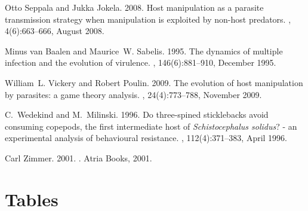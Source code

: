 \documentclass[11pt]{article}
\begin{document}
\begin{thebibliography}{24}
Otto Seppala and Jukka Jokela. 2008.
\newblock Host manipulation as a parasite transmission strategy when
  manipulation is exploited by non-host predators.
, 4(6):663--666, August 2008.

Minus van Baalen and Maurice~W. Sabelis. 1995.
\newblock The dynamics of multiple infection and the evolution of virulence.
, 146(6):881--910, December 1995.

William~L. Vickery and Robert Poulin. 2009.
\newblock The evolution of host manipulation by parasites: a game theory
  analysis.
, 24(4):773--788, November 2009.

C.~Wedekind and M.~Milinski. 1996.
\newblock Do three-spined sticklebacks avoid consuming copepods, the first
  intermediate host of \textit{Schistocephalus solidus}? - an experimental
  analysis of behavioural resistance.
, 112(4):371--383, April 1996.

Carl Zimmer. 2001.
.
\newblock Atria Books, 2001.

\end{thebibliography}

\newpage{}

\section*{Tables}
\renewcommand{\thetable}{\arabic{table}}
\setcounter{table}{0}
\end{document}
